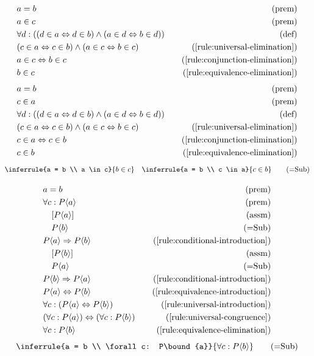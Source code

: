 \begin{align*}
    \premise{a = b}\\
    \premise{a \in c}\\
    \bydefinition{\forall d: ((d \in a \lequiv d \in b) \wedge (a \in d \lequiv b \in d))}\\
    \byrule{(c \in a \lequiv c \in b) \wedge (a \in c \lequiv b \in c)}{\ref{rule:universal-elimination}}\\
    \byrule{a \in c \lequiv b \in c}{\ref{rule:conjunction-elimination}}\\
    \byrule{b \in c}{\ref{rule:equivalence-elimination}}
\end{align*}
\begin{align*}
    \premise{a = b}\\
    \premise{c \in a}\\
    \bydefinition{\forall d: ((d \in a \lequiv d \in b) \wedge (a \in d \lequiv b \in d))}\\
    \byrule{(c \in a \lequiv c \in b) \wedge (a \in c \lequiv b \in c)}{\ref{rule:universal-elimination}}\\
    \byrule{c \in a \lequiv c \in b}{\ref{rule:conjunction-elimination}}\\
    \byrule{c \in b}{\ref{rule:equivalence-elimination}}
\end{align*}
\begin{equation}
    \inferrule{a = b \\ a \in c}{b \in c} \quad \inferrule{a = b \\ c \in a}{c \in b}
    \tag{{$=$}Sub}
\end{equation}

\begin{align*}
    \premise{a = b}\\
    \premise{\forall c: P\bound{a}}\\
    \assumption[1]{P\bound{a}}\\
    \byrule[1]{P\bound{b}}{{=}Sub}\\
    \byrule{P\bound{a} \implies P\bound{b}}{\ref{rule:conditional-introduction}}\\
    \assumption[1]{P\bound{b}}\\
    \byrule[1]{P\bound{a}}{=Sub}\\
    \byrule{P\bound{b} \implies P\bound{a}}{\ref{rule:conditional-introduction}}\\
    \byrule{P\bound{a} \lequiv P\bound{b}}{\ref{rule:equivalence-introduction}}\\
    \byrule{\forall c: (P\bound{a} \lequiv P\bound{b})}{\ref{rule:universal-introduction}}\\
    \byrule{(\forall c: P\bound{a}) \lequiv (\forall c: P\bound{b})}{\ref{rule:universal-congruence}}\\
    \byrule{\forall c: P\bound{b}}{\ref{rule:equivalence-elimination}}
\end{align*}
\begin{equation}
    \inferrule{a = b \\ \forall c: P\bound{a}}{\forall c: P\bound{b}}
    \tag{{$=$}Sub}
\end{equation}

